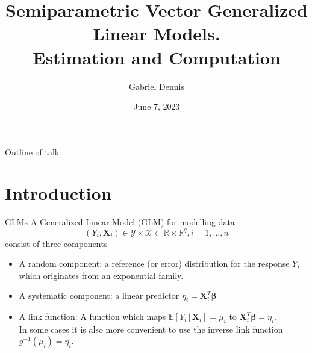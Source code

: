 \documentclass[9pt,notes=hide]{beamer}
\title{Semiparametric Vector Generalized Linear Models.\\ 
    \small{Estimation and Computation}
}
\author{Gabriel Dennis}
\date{June 7, 2023}
\newcommand{\vect}[1]{\boldsymbol #1}
\newcommand{\Em}{\mathbb E}
\newcommand{\R}{\mathbb R}
\newcommand{\gvn}{\,|\,}
\newcommand{\vbe}{\vect{\beta}}
\newcommand{\X}{\vect{X}}
\begin{document}
\maketitle

\begin{frame}{Outline of talk}
	\tableofcontents
\end{frame}




\section{Introduction}

\begin{frame}{GLMs}
	A Generalized Linear Model (GLM) for modelling data
	\[
		(Y_i, \X_i) \in \mathcal{Y} \times \mathcal{X} \subset \R \times \R^q, i = 1,\dots, n
	\]
	consist of three components \pause
	\pause[\thebeamerpauses]
	\begin{itemize}[<+->]
		\item A random component:  a reference (or error) distribution for the response 
		      $Y$,  which originates from an exponential family.
		\item A systematic component: a linear predictor $\eta_i = \X_i^T\vbe$
		\item A link function: A function which maps $\Em[Y_i \gvn \X_i] = \mu_i$ to $\X_i^T\vbe = \eta_i$.\\
		      In some cases it is also more convenient to use the inverse link function $g^{-1}(\mu_i) = \eta_i$.
	\end{itemize}

\end{frame}
\end{document}
